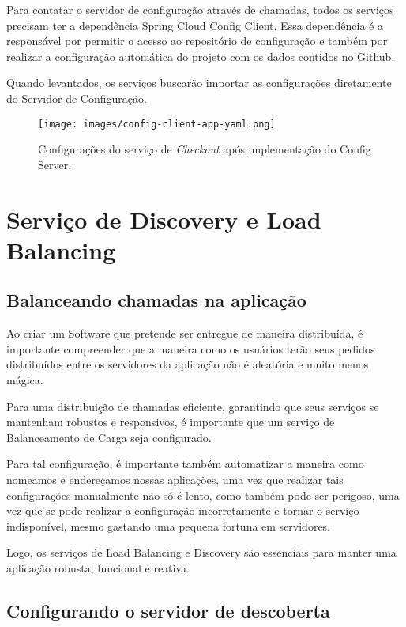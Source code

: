 \documentclass[12pt, openright, oneside, a4paper, article,
  section=TITLE
]{abntex2}
\begin{document}
Para contatar o servidor de configuração através de chamadas, todos os serviços precisam ter a dependência Spring Cloud Config Client. Essa dependência é a responsável por permitir o acesso ao repositório de configuração e também por realizar a configuração automática do projeto com os dados contidos no Github. 

Quando levantados, os serviços buscarão importar as configurações diretamente do Servidor de Configuração. 

\begin{figure}[htb]
  \begin{center}
    \texttt{[image: images/config-client-app-yaml.png]}
  \end{center}
  \caption{Configurações do serviço de \textit{Checkout} após implementação do Config Server.}
\end{figure}

\section{Serviço de Discovery e Load Balancing}

\subsection{Balanceando chamadas na aplicação}

Ao criar um Software que pretende ser entregue de maneira distribuída, é importante compreender que a maneira como os usuários terão seus pedidos distribuídos entre os servidores da aplicação não é aleatória e muito menos mágica. 

Para uma distribuição de chamadas eficiente, garantindo que seus serviços se mantenham robustos e responsivos, é importante que um serviço de Balanceamento de Carga seja configurado. 

Para tal configuração, é importante também automatizar a maneira como nomeamos e endereçamos nossas aplicações, uma vez que realizar tais configurações manualmente não só é lento, como também pode ser perigoso, uma vez que se pode realizar a configuração incorretamente e tornar o serviço indisponível, mesmo gastando uma pequena fortuna em servidores. 

Logo, os serviços de Load Balancing e Discovery são essenciais para manter uma aplicação robusta, funcional e reativa. 


\subsection{Configurando o servidor de descoberta}
\end{document}
